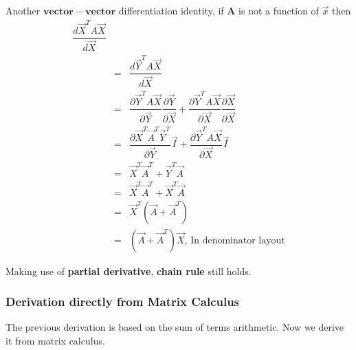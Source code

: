 Another $\mathbf{vector-vector}$ differentiation identity, if $\mathbf{A}$ is not a function of $\vec{x}$ then
\begin{eqnarray}
\dfrac{d\vec{X}^TA\vec{X}}{d\vec{X}} \\
&=& \dfrac{d\vec{Y}^TA\vec{X}}{d\vec{X}} \\
&=& \dfrac{\partial\vec{Y}^TA\vec{X}}{\partial\vec{Y}} \dfrac{\partial\vec{Y}}{\partial\vec{X}} +  \dfrac{\partial\vec{Y}^TA\vec{X}}{\partial\vec{X}} \dfrac{\partial\vec{X}}{\partial\vec{X}}\\
&=& \dfrac{\partial \vec{X}^T \vec{A}^T\vec{Y}^T}{\partial\vec{Y}} \vec{I} +  \dfrac{\partial\vec{Y}^TA\vec{X}}{\partial\vec{X}} \vec{I} \\
&=& \vec{X}^T \vec{A}^T + \vec{Y}^T\vec{A}\\
&=& \vec{X}^T \vec{A}^T + \vec{X}^T\vec{A}\\
&=& \vec{X}^T(\vec{A}+\vec{A}^T)\\
&=& (\vec{A}+\vec{A}^T)\vec{X} \text{, In denominator layout}
\end{eqnarray}

Making use of \textbf{partial derivative}, \textbf{chain rule} still holds. 

\subsubsection{Derivation directly from Matrix Calculus}
The previous derivation is based on the sum of terms arithmetic. Now we derive it from matrix calculus.

